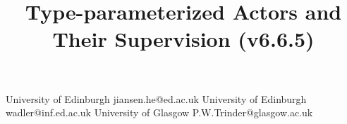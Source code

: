 \documentclass[preprint, authoryear, 10 pt]{sigplanconf}
\begin{document}

\title{Type-parameterized Actors and Their Supervision (v6.6.5) } %

           {University of Edinburgh}
           {jiansen.he@ed.ac.uk}
           {University of Edinburgh}
           {wadler@inf.ed.ac.uk}
           {University of Glasgow}
           {P.W.Trinder@glasgow.ac.uk}





\maketitle
\end{document}
